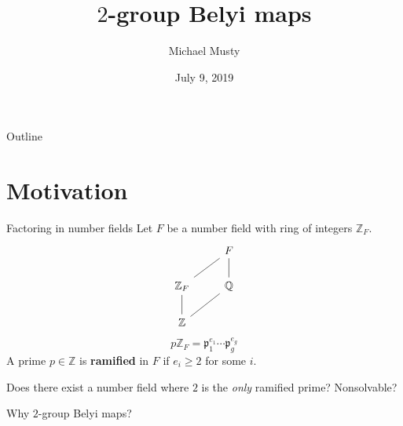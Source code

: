 \documentclass[xcolor=dvipsnames]{beamer}
\title{$2$-group Belyi maps}
\author{Michael Musty}
\date{July 9, 2019}
\institute{Dartmouth College}
\theoremstyle{plain}
\newcommand{\QQ}{\mathbb Q}
\newcommand{\ZZ}{\mathbb Z}
\begin{document}
  \maketitle
  \begin{frame}{Outline}
    \tableofcontents
  \end{frame}
  \section{Motivation}{
    \begin{frame}[fragile]{Factoring in number fields}
      Let $F$ be a number field with ring
      of integers $\ZZ_F$.
      \begin{align*}
        \begin{tikzcd}[ampersand replacement=\&]
          \&F\arrow[dash]{dl}\\
          \ZZ_F\arrow[dash]{d}\&\QQ\arrow[dash]{u}\\
          \ZZ\arrow[dash]{ur}
        \end{tikzcd}
      \end{align*}
      \pause
      \[
        p\ZZ_F = \mathfrak{p}_1^{e_1}\cdots\mathfrak{p}_g^{e_g}
      \]
      \pause
      A prime $p\in\ZZ$ is \textbf{ramified} in $F$ if
      $e_i\geq 2$ for some $i$.
      \pause\par
      Does there exist a number field
      where $2$ is the \emph{only} ramified prime?
      \pause
      Nonsolvable?
    \end{frame}
    \begin{frame}[fragile]{Why $2$-group Belyi maps?}
      \begin{center}
\end{center}
\end{frame}}
\end{document}
